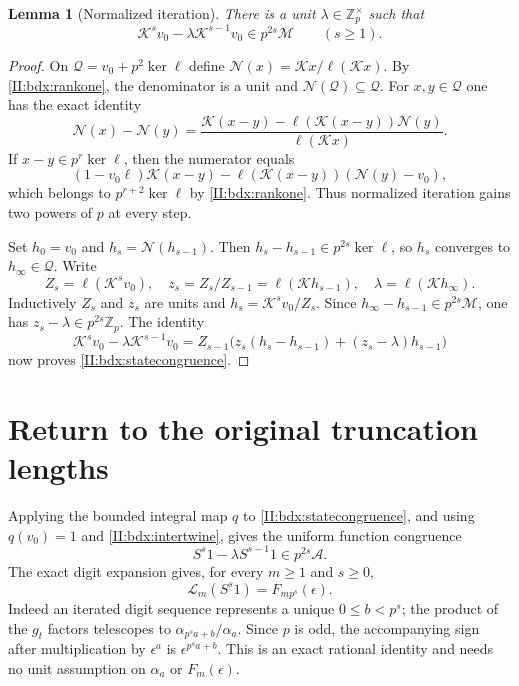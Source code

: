 \documentclass[11pt,letterpaper]{article}
\newtheorem{lemma}[theorem]{Lemma}
\theoremstyle{definition}
\theoremstyle{remark}
\begin{document}
\begin{lemma}[Normalized iteration]\label{II:bdx:iteration}
There is a unit $\lambda\in\mathbb Z_p^\times$ such that
\begin{equation}\label{II:bdx:statecongruence}
 \mathcal K^s v_0-\lambda\mathcal K^{s-1}v_0
                    \in p^{2s}\mathcal M\qquad(s\ge1).
\end{equation}
\end{lemma}
\begin{proof}
On $\mathcal Q=v_0+p^2\ker\ell$ define
$\mathcal N(x)=\mathcal Kx/\ell(\mathcal Kx)$.
By \eqref{II:bdx:rankone}, the denominator is a unit and
$\mathcal N(\mathcal Q)\subseteq\mathcal Q$.
For $x,y\in\mathcal Q$ one has the exact identity
\[
 \mathcal N(x)-\mathcal N(y)
 =\frac{\mathcal K(x-y)-\ell(\mathcal K(x-y))\mathcal N(y)}
              {\ell(\mathcal Kx)}.
\]
If $x-y\in p^r\ker\ell$, then the numerator equals
\[
 (1-v_0\ell)\mathcal K(x-y)
 -\ell(\mathcal K(x-y))(\mathcal N(y)-v_0),
\]
which belongs to $p^{r+2}\ker\ell$ by \eqref{II:bdx:rankone}.
Thus normalized iteration gains two powers of $p$ at every step.

Set $h_0=v_0$ and $h_s=\mathcal N(h_{s-1})$.
Then $h_s-h_{s-1}\in p^{2s}\ker\ell$, so $h_s$ converges to
$h_\infty\in\mathcal Q$. Write
\[
 Z_s=\ell(\mathcal K^s v_0),\quad
 z_s=Z_s/Z_{s-1}=\ell(\mathcal K h_{s-1}),\quad
 \lambda=\ell(\mathcal K h_\infty).
\]
Inductively $Z_s$ and $z_s$ are units and
$h_s=\mathcal K^s v_0/Z_s$. Since
$h_\infty-h_{s-1}\in p^{2s}\mathcal M$, one has
$z_s-\lambda\in p^{2s}\mathbb Z_p$.
The identity
\[
 \mathcal K^s v_0-\lambda\mathcal K^{s-1}v_0
 =Z_{s-1}\bigl(z_s(h_s-h_{s-1})
                       +(z_s-\lambda)h_{s-1}\bigr)
\]
now proves \eqref{II:bdx:statecongruence}.
\end{proof}

\section{Return to the original truncation lengths}

Applying the bounded integral map $q$ to
\eqref{II:bdx:statecongruence}, and using $q(v_0)=1$ and
\eqref{II:bdx:intertwine}, gives the uniform function congruence
\begin{equation}\label{II:bdx:functioncongruence}
 S^s1-\lambda S^{s-1}1\in p^{2s}\mathcal A.
\end{equation}
The exact digit expansion gives, for every $m\ge1$ and $s\ge0$,
\begin{equation}\label{II:bdx:prefix}
 \mathcal L_m(S^s1)=F_{mp^s}(\epsilon).
\end{equation}
Indeed an iterated digit sequence represents a unique
$0\le b<p^s$; the product of the $g_t$ factors telescopes to
$\alpha_{p^sa+b}/\alpha_a$. Since $p$ is odd, the accompanying sign
after multiplication by $\epsilon^a$ is $\epsilon^{p^sa+b}$.
This is an exact rational identity and needs no unit assumption on
$\alpha_a$ or $F_m(\epsilon)$.
\end{document}
